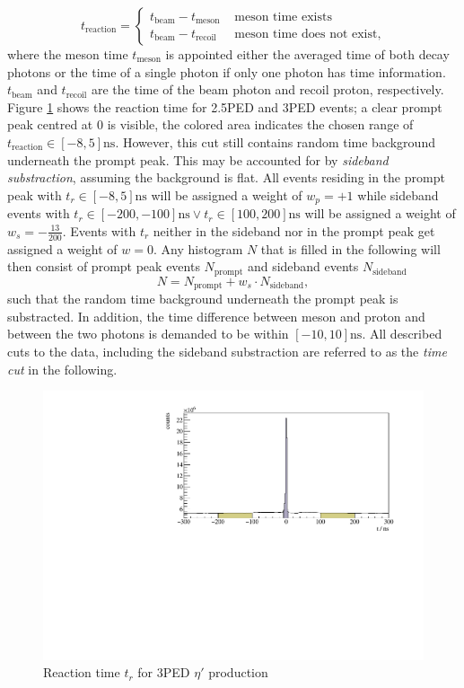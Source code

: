 \begin{equation}
	t_\text{reaction}=\begin{cases}
		t_\text{beam}-t_\text{meson} & \text{ meson time exists}\\
		t_\text{beam}-t_\text{recoil} & \text{ meson time does not exist},
	\end{cases}
\end{equation}
where the meson time $t_\text{meson}$ is appointed either the averaged time of both decay photons or the time of a single photon if only one photon has time information. $t_\text{beam}$ and $t_\text{recoil}$ are the time of the beam photon and recoil proton, respectively. Figure \ref{fig:time_r} shows the reaction time for 2.5PED and 3PED events; a clear prompt peak centred at 0 is visible, the colored area indicates the chosen range of $t_\text{reaction}\in[-8,5]\si{\nano\s}$. However, this cut still contains random time background underneath the prompt peak. This may be accounted for by \emph{sideband substraction}, assuming the background is flat. All events residing in the prompt peak with $t_r\in[-8,5]\si{\nano\s}$ will be assigned a weight of $w_p=+1$ while sideband events with $t_r\in[-200,-100]\si{\nano\s}\lor t_r\in[100,200]\si{\nano\s}$ will be assigned a weight of $w_s=-\frac{13}{200}$. Events with $t_r$ neither in the sideband nor in the prompt peak get assigned a weight of $w=0$. Any histogram $N$ that is filled in the following will then consist of prompt peak events $N_\text{prompt}$ and sideband events $N_\text{sideband}$ $$N=N_\text{prompt}+w_s\cdot N_\text{sideband},$$ such that the random time background underneath the prompt peak is substracted. In addition, the time difference between meson and proton and between the two photons is demanded to be within $[-10,10]\si{\nano\s}$. All described cuts to the data, including the sideband substraction are referred to as the \emph{time cut} in the following.

\begin{figure}[htbp]
	\centering
	\includegraphics[width=\linewidth]{../figs/hydrogen/time/reaction_time.pdf}
	\caption{Reaction time $t_r$ for 3PED $\eta'$ production}
	\label{fig:time_r}
\end{figure} 

